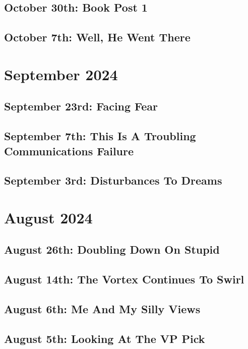 \documentclass[12pt,letterpaper]{report}
\begin{document}
\subsection{October 30th: Book Post 1}

\subsection{October 7th: Well, He Went There}

\section{September 2024}
\subsection{September 23rd: Facing Fear}

\subsection{September 7th: This Is A Troubling Communications Failure}

\subsection{September 3rd: Disturbances To Dreams}

\section{August 2024}
\subsection{August 26th: Doubling Down On Stupid}

\subsection{August 14th: The Vortex Continues To Swirl}

\subsection{August 6th: Me And My Silly Views}

\subsection{August 5th: Looking At The VP Pick}

\end{document}
